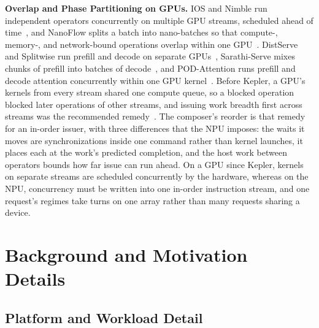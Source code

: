 \textbf{Overlap and Phase Partitioning on GPUs.}
IOS and Nimble run independent operators concurrently on multiple GPU streams, scheduled ahead of time~\citep{ding2021ios,kwon2020nimble}, and NanoFlow splits a batch into nano-batches so that compute-, memory-, and network-bound operations overlap within one GPU~\citep{zhu2025nanoflow}.
DistServe and Splitwise run prefill and decode on separate GPUs~\citep{zhong2024distserve,patel2024splitwise}, Sarathi-Serve mixes chunks of prefill into batches of decode~\citep{agrawal2024sarathi}, and POD-Attention runs prefill and decode attention concurrently within one GPU kernel~\citep{kamath2025pod}.
Before Kepler, a GPU's kernels from every stream shared one compute queue, so a blocked operation blocked later operations of other streams, and issuing work breadth first across streams was the recommended remedy~\citep{rennich2012streams}.
The composer's reorder is that remedy for an in-order issuer, with three differences that the NPU imposes: the waits it moves are synchronizations inside one command rather than kernel launches, it places each at the work's predicted completion, and the host work between operators bounds how far issue can run ahead.
On a GPU since Kepler, kernels on separate streams are scheduled concurrently by the hardware, whereas on the NPU, concurrency must be written into one in-order instruction stream, and one request's regimes take turns on one array rather than many requests sharing a device.

\section{Background and Motivation Details}
\label{app:bg-details}

\subsection{Platform and Workload Detail}
\label{app:platform}

